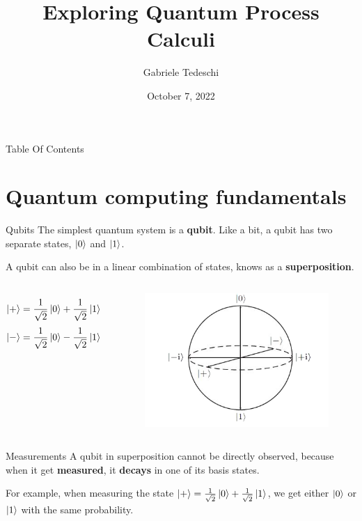 \documentclass{beamer}
\title{Exploring Quantum Process Calculi}
\author{Gabriele Tedeschi}
\institute{University of Pisa}
\date{October 7, 2022}
\newcommand{\kz}{\ket{0}}
\newcommand{\ko}{\ket{1}}
\newcommand{\kpl}{\ket{+}}
\newcommand{\km}{\ket{-}}
\newcommand{\oost}{\frac{1}{\sqrt{2}}}
\begin{document}
\frame{\titlepage}

\begin{frame}{Table Of Contents}
\tableofcontents
\end{frame}

\section{Quantum computing fundamentals}
\begin{frame}{Qubits}
The simplest quantum system is a \textbf{qubit}. Like a bit, a qubit has two separate states, $\kz$ and $\ko$.


A qubit can also be in a linear combination of states, knows as a \textbf{superposition}.
\begin{columns}
\[ \kpl = \oost \kz + \oost \ko \]
\[\km = \oost \kz - \oost \ko \]

\begin{figure}
\includegraphics[scale=0.6]{bloch_no_bkg}
\end{figure} 
\end{columns}
\end{frame}



\begin{frame}{Measurements}
A qubit in superposition cannot be directly observed, because when it get \textbf{measured}, it \textbf{decays} in one of its basis states.

\bigskip


\bigskip

For example, when measuring the state $\kpl = \oost \kz + \oost \ko$, we get either $\kz$ or $\ko$ with the same probability. 
\end{frame}
\end{document}
